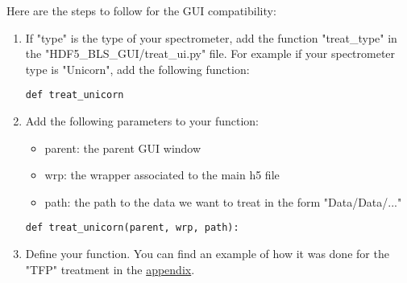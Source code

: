 Here are the steps to follow for the GUI compatibility:
\begin{enumerate}
    \item If "type" is the type of your spectrometer, add the function "treat\_type" in the "HDF5\_BLS\_GUI/treat\_ui.py" file. For example if your spectrometer type is "Unicorn", add the following function:
\begin{lstlisting}
def treat_unicorn
\end{lstlisting}
    \item Add the following parameters to your function:
    \begin{itemize}
        \item parent: the parent GUI window
        \item wrp: the wrapper associated to the main h5 file
        \item path: the path to the data we want to treat in the form "Data/Data/..."
    \end{itemize}
\begin{lstlisting}
def treat_unicorn(parent, wrp, path):
\end{lstlisting}
    \item Define your function. You can find an example of how it was done for the "TFP" treatment in the \hyperref[subsec:example_treatment.TFP]{appendix}.
\end{enumerate}